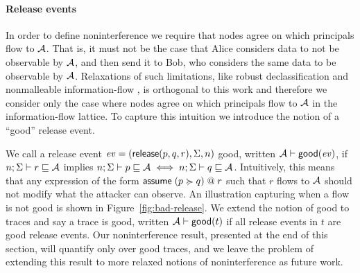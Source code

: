 \paragraph{Release events}\label{sec:release-events}
In order to define noninterference we require that nodes agree on which principals flow to $\mathcal{A}$. That is, it must not be the case that Alice considers data to not be observable by $\mathcal{A}$, and then send it to Bob, who considers the same data to be observable by $\mathcal{A}$. Relaxations of such limitations, like robust declassification \cite{Zdancewic:2001:RD:872752.873524, Myers:2004:ERD:1009380.1009673} and nonmalleable information-flow \cite{Cecchetti:2017:NIF:3133956.3134054}, is orthogonal to this work and therefore we consider only the case where nodes agree on which principals flow to $\mathcal{A}$ in the information-flow lattice. To capture this intuition we introduce the notion of a ``good'' release event.

We call a release event $\mathit{ev} = (\mathsf{release}(p, q, r), \Sigma, n)$ good, written $\mathcal{A} \vdash \mathsf{good}(\mathit{ev})$, if $n; \Sigma \vdash r \sqsubseteq \mathcal{A}$ implies $n; \Sigma \vdash p \sqsubseteq \mathcal{A} \iff n; \Sigma \vdash q \sqsubseteq \mathcal{A}$. Intuitively, this means that any expression of the form $\mathsf{assume}\;(p \succcurlyeq q) \;@ \; r$ such that $r$ flows to $\mathcal{A}$ should not modify what the attacker can observe. An illustration capturing when a flow is not good is shown in Figure~\ref{fig:bad-release}. We extend the notion of good to traces and say a trace is good, written $\mathcal{A} \vdash \mathsf{good}(t)$ if all release events in $t$ are good release events. Our noninterference result, presented at the end of this section, will quantify only over good traces, and we leave the problem of extending this result to more relaxed notions of noninterference as future work.


